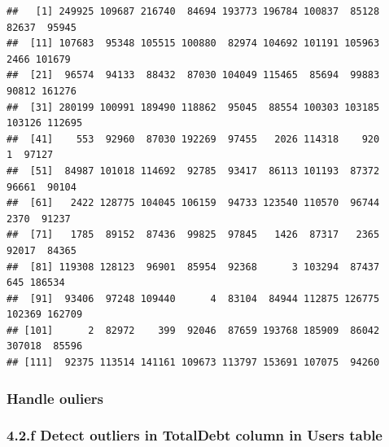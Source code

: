 \documentclass[
]{article}
\newenvironment{Shaded}{\begin{snugshade}}{\end{snugshade}}
\newcommand{\NormalTok}[1]{#1}
\newcommand{\OtherTok}[1]{\textcolor[rgb]{0.56,0.35,0.01}{#1}}
\newcommand{\SpecialCharTok}[1]{\textcolor[rgb]{0.81,0.36,0.00}{\textbf{#1}}}
\begin{document}
\begin{verbatim}
##   [1] 249925 109687 216740  84694 193773 196784 100837  85128  82637  95945
##  [11] 107683  95348 105515 100880  82974 104692 101191 105963   2466 101679
##  [21]  96574  94133  88432  87030 104049 115465  85694  99883  90812 161276
##  [31] 280199 100991 189490 118862  95045  88554 100303 103185 103126 112695
##  [41]    553  92960  87030 192269  97455   2026 114318    920      1  97127
##  [51]  84987 101018 114692  92785  93417  86113 101193  87372  96661  90104
##  [61]   2422 128775 104045 106159  94733 123540 110570  96744   2370  91237
##  [71]   1785  89152  87436  99825  97845   1426  87317   2365  92017  84365
##  [81] 119308 128123  96901  85954  92368      3 103294  87437    645 186534
##  [91]  93406  97248 109440      4  83104  84944 112875 126775 102369 162709
## [101]      2  82972    399  92046  87659 193768 185909  86042 307018  85596
## [111]  92375 113514 141161 109673 113797 153691 107075  94260
\end{verbatim}

\subsubsection{Handle ouliers}\label{handle-ouliers-3}

\begin{Shaded}
\end{Shaded}

\subsubsection{4.2.f Detect outliers in TotalDebt column in Users
table}\label{f-detect-outliers-in-totaldebt-column-in-users-table}
\end{document}
